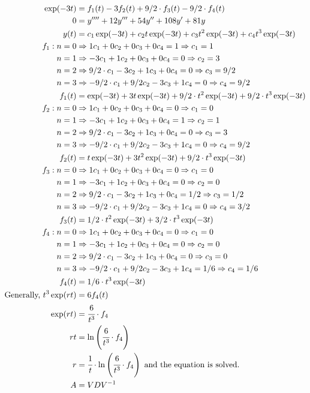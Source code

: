 \documentclass[12pt,a4paper]{article}
\begin{document}
\begin{align}
\exp (-3t) &= f_1(t) - 3 f_2(t) + 9/2\cdot f_3(t) - 9/2\cdot f_4(t) \\
0 &= y'''' + 12 y''' + 54 y'' + 108 y' + 81 y \\
y(t) &= c_1 \exp(-3t) + c_2 t \exp(-3t) + c_3 t^2 \exp(-3t) + c_4 t^3 \exp(-3t) \\
f_1: n = 0 &\Rightarrow 1 c_1 + 0 c_2 + 0 c_3 + 0 c_4 = 1 \Rightarrow c_1 = 1 \\
n = 1 &\Rightarrow -3 c_1 + 1 c_2 + 0 c_3 + 0 c_4 = 0 \Rightarrow c_2 = 3 \\
n = 2 &\Rightarrow 9/2\cdot c_1 - 3 c_2 + 1 c_3 + 0 c_4 = 0 \Rightarrow c_3 = 9/2 \\
n = 3 &\Rightarrow - 9/2\cdot c_1 + 9/2 c_2 - 3 c_3 + 1 c_4 = 0 \Rightarrow c_4 = 9/2 \\
f_1(t) &= \exp(-3t) + 3 t \exp(-3t) + 9/2\cdot t^2 \exp(-3t) + 9/2\cdot t^3 \exp(-3t) \\
f_2: n = 0 &\Rightarrow 1 c_1 + 0 c_2 + 0 c_3 + 0 c_4 = 0 \Rightarrow c_1 = 0 \\
n = 1 &\Rightarrow -3 c_1 + 1 c_2 + 0 c_3 + 0 c_4 = 1 \Rightarrow c_2 = 1 \\
n = 2 &\Rightarrow 9/2\cdot c_1 - 3 c_2 + 1 c_3 + 0 c_4 = 0 \Rightarrow c_3 = 3 \\
n = 3 &\Rightarrow - 9/2\cdot c_1 + 9/2 c_2 - 3 c_3 + 1 c_4 = 0 \Rightarrow c_4 = 9/2 \\
f_2(t) &= t \exp(-3t) + 3 t^2 \exp(-3t) + 9/2\cdot t^3 \exp(-3t) \\
f_3: n = 0 &\Rightarrow 1 c_1 + 0 c_2 + 0 c_3 + 0 c_4 = 0 \Rightarrow c_1 = 0 \\
n = 1 &\Rightarrow -3 c_1 + 1 c_2 + 0 c_3 + 0 c_4 = 0 \Rightarrow c_2 = 0 \\
n = 2 &\Rightarrow 9/2\cdot c_1 - 3 c_2 + 1 c_3 + 0 c_4 = 1/2 \Rightarrow c_3 = 1/2 \\
n = 3 &\Rightarrow - 9/2\cdot c_1 + 9/2 c_2 - 3 c_3 + 1 c_4 = 0 \Rightarrow c_4 = 3/2 \\
f_3(t) &= 1/2\cdot t^2 \exp(-3t) + 3/2\cdot t^3 \exp(-3t) \\
f_4: n = 0 &\Rightarrow 1 c_1 + 0 c_2 + 0 c_3 + 0 c_4 = 0 \Rightarrow c_1 = 0 \\
n = 1 &\Rightarrow -3 c_1 + 1 c_2 + 0 c_3 + 0 c_4 = 0 \Rightarrow c_2 = 0 \\
n = 2 &\Rightarrow 9/2\cdot c_1 - 3 c_2 + 1 c_3 + 0 c_4 = 0 \Rightarrow c_3 = 0 \\
n = 3 &\Rightarrow - 9/2\cdot c_1 + 9/2 c_2 - 3 c_3 + 1 c_4 = 1/6 \Rightarrow c_4 = 1/6 \\
f_4(t) &= 1/6\cdot t^3 \exp(-3t) \\
\text{Generally, }t^3 \exp(rt) &= 6 f_4(t) \\
\exp (rt) &= \cfrac{6}{t^3}\cdot f_4 \\
rt &= \ln \left( \cfrac{6}{t^3}\cdot f_4\right) \\
r &= \cfrac{1}{t}\cdot \ln \left( \cfrac{6}{t^3}\cdot f_4\right) \text{ and the equation is solved.} \\
A &= VDV^{-1}
\end{align}
\end{document}
